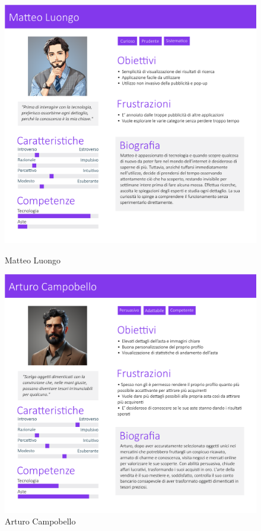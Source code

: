         \begin{figure}[!htb]
           \begin{minipage}{0.48\textwidth}
                \centering
             \includegraphics[width=.7\linewidth]{Immagini/Personas/Matteo Luongo.pdf}
             \caption{Matteo Luongo}\label{Fig:Matteo Luongo}
           \end{minipage}\hfill
           \begin{minipage}{0.48\textwidth}
                \centering
             \includegraphics[width=.7\linewidth]{Immagini/Personas/Arturo Campobello.pdf}
             \caption{Arturo Campobello}\label{Fig:Arturo Campobello}
           \end{minipage}
        \end{figure}

    \newpage
    

